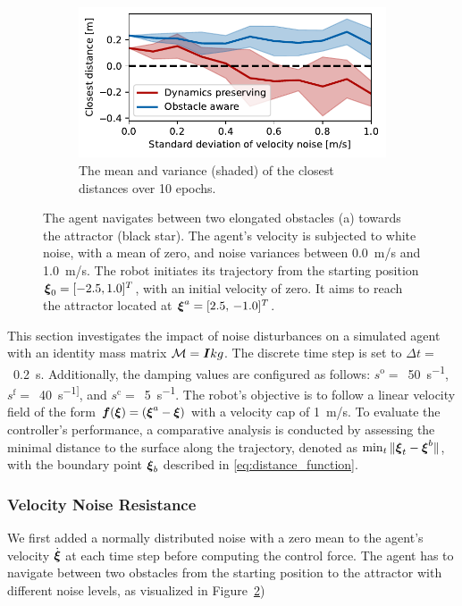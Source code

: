 \begin{figure}[htbp]
\begin{subfigure}{\columnwidth}
	\else
    \includegraphics[width=\textwidth]{figures/comparison_velocity_noise}
	\fi
    \caption{The mean and variance (shaded) of the closest distances over 10 epochs.}
    \label{fig:comparison_velocity_noise}
    \end{subfigure}
	\caption{The agent navigates between two elongated obstacles (a) towards the attractor (black star). The agent's velocity is subjected to white noise, with a mean of zero, and noise variances between \qty{0.0}{m/s} and \qty{1.0}{m/s}. The robot initiates its trajectory from the starting position $\boldsymbol{\xi}_0 = [-2.5, 1.0]^T$, with an initial velocity of zero. It aims to reach the attractor located at $\boldsymbol{\xi}^a = [2.5, \, -1.0]^T$.}
\label{fig:velocity_noise}
\end{figure}

This section investigates the impact of noise disturbances on a simulated agent with an identity mass matrix $\mathcal{M} = \boldsymbol{I} kg$. The discrete time step is set to $\Delta t = $~\qty{0.2}{s}. Additionally, the damping values are configured as follows: 
$s^{\mathrm{o}}=$~\qty{50}{s^{-1}},
$s^{\mathrm{f}}=$~\qty{40}{s^{-1]}}, and
$s^{\mathrm{c}}=$~\qty{5}{s^{-1}}.
The robot's objective is to follow a linear velocity field of the form $\boldsymbol{f}(\boldsymbol{\xi}) = (\boldsymbol{\xi}^a - \boldsymbol{\xi})$ with a velocity cap of \qty{1}{m/s}.
To evaluate the controller's performance, a comparative analysis is conducted by assessing the minimal distance to the surface along the trajectory, denoted as $ \min_t \| \boldsymbol{\xi}_t - \boldsymbol{\xi}^b \| $, with the boundary point $\boldsymbol{\xi}_b$ described in \eqref{eq:distance_function}. 
\fi

\iflong
\subsubsection{Velocity Noise Resistance}
We first added a normally distributed noise with a zero mean to the agent's velocity $\dot{\boldsymbol{ \xi}}$ at each time step before computing the control force. The agent has to navigate between two obstacles from the starting position to the attractor with different noise levels, as visualized in Figure~\ref{fig:velocity_noise})

